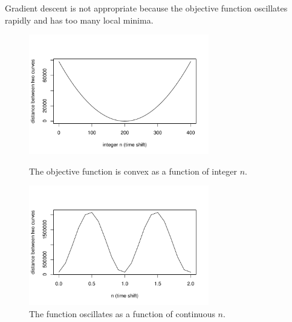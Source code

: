 		Gradient descent is not appropriate because the objective function oscillates rapidly and has too many local minima. 
		\begin{figure}[H]
		\centering
		\includegraphics[width=0.7\textwidth]{../simulation/Dist_vs_integer_timeshift}\\
		\caption{The objective function is convex as a function of integer $n$.}
		\end{figure}
		\begin{figure}[H]
		\centering
		\includegraphics[width=0.7\textwidth]{../simulation/Oscillating}
		\caption{The function oscillates as a function of continuous $n$.}
		\end{figure}


		


